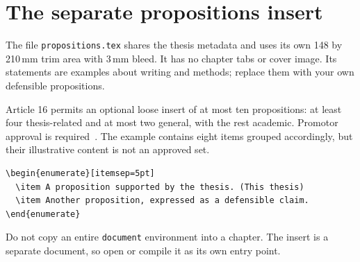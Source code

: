 
\section{The separate propositions insert}
The file \texttt{propositions.tex} shares the thesis metadata and uses its own
148 by 210\,mm trim area with 3\,mm bleed. It has no chapter tabs or cover image.
Its statements are examples about writing and methods; replace them with your
own defensible propositions.

Article 16 permits an optional loose insert of at most ten propositions:
at least four thesis-related and at most two general, with the rest academic.
Promotor approval is required~\cite{ut2026}. The example contains eight items
grouped accordingly, but their illustrative content is not an approved set.

\begin{lstlisting}
\begin{enumerate}[itemsep=5pt]
  \item A proposition supported by the thesis. (This thesis)
  \item Another proposition, expressed as a defensible claim.
\end{enumerate}
\end{lstlisting}
Do not copy an entire \texttt{document} environment into a chapter. The insert
is a separate document, so open or compile it as its own entry point.

